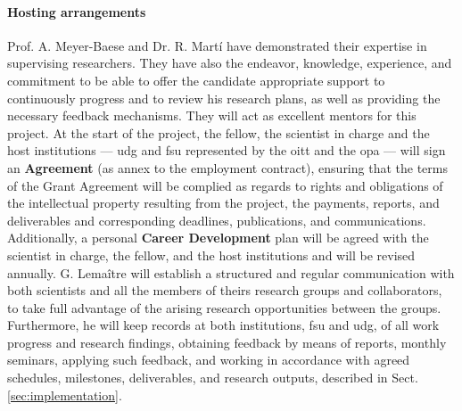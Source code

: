 

\vspace*{-10pt}

\paragraph{Hosting arrangements}

Prof. A. Meyer-Baese and Dr. R. Mart\'i have demonstrated their expertise in supervising researchers.
They have also the endeavor, knowledge, experience, and commitment to be able to offer the candidate appropriate support to continuously progress and to review his research plans, as well as providing the necessary feedback mechanisms.
They will act as excellent mentors for this project.
At the start of the project, the fellow, the scientist in charge and the host institutions --- \ac{udg} and \ac{fsu} represented by the \ac{oitt} and the \ac{opa} --- will sign an \textbf{Agreement} (as annex to the employment contract), ensuring that the terms of the Grant Agreement will be complied as regards to rights and obligations of the intellectual property resulting from the project, the payments, reports, and deliverables and corresponding deadlines, publications, and communications.
Additionally, a personal \textbf{Career Development} plan will be agreed with the scientist in charge, the fellow, and the host institutions and will be revised annually.
G. Lema\^itre will establish a structured and regular communication with both scientists and all the members of theirs research groups and collaborators, to take full advantage of the arising research opportunities between the groups.
Furthermore, he will keep records at both institutions, \ac{fsu} and \ac{udg}, of all work progress and research findings, obtaining feedback by means of reports, monthly seminars, applying such feedback, and working in accordance with agreed schedules, milestones, deliverables, and research outputs, described in Sect.\,\ref{sec:implementation}.

